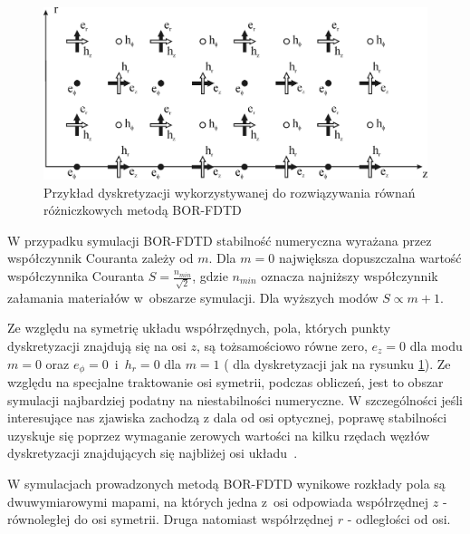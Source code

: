 \begin{figure}
	\includegraphics[width=\textwidth]{subart/fdtd/R5_TFSF.png}
	\caption{Przykład dyskretyzacji wykorzystywanej do rozwiązywania równań różniczkowych metodą BOR-FDTD \cite{antosiewicz2009wplyw}}
	\label{fig:bor-dysk}
\end{figure}
W przypadku symulacji BOR-FDTD stabilność numeryczna wyrażana przez współczynnik Couranta zależy od $m$. Dla $m=0$ największa dopuszczalna wartość współczynnika Couranta $S=\frac{n_{min}}{\sqrt{2}}$, gdzie $n_{min}$ oznacza najniższy współczynnik załamania materiałów w~obszarze symulacji. Dla wyższych modów $S \propto m+1$. 

Ze względu na symetrię układu współrzędnych, pola, których punkty dyskretyzacji znajdują się na osi $z$, są tożsamościowo równe zero, $e_z=0$ dla modu $m=0$ oraz $e_{\phi}=0$~i~$h_r=0$ dla $m=1$ ( dla dyskretyzacji jak na rysunku \ref{fig:bor-dysk}). Ze względu na specjalne traktowanie osi symetrii, podczas obliczeń, jest to obszar symulacji najbardziej podatny na niestabilności numeryczne. W szczególności jeśli interesujące nas zjawiska zachodzą z dala od osi optycznej, poprawę stabilności uzyskuje się poprzez wymaganie zerowych wartości na kilku rzędach węzłów dyskretyzacji znajdujących się najbliżej osi układu~\cite{OskooiRo10}.

W symulacjach prowadzonych metodą BOR-FDTD wynikowe rozkłady pola są dwuwymiarowymi mapami, na których jedna z~osi odpowiada współrzędnej $z$ - równoległej do osi symetrii. Druga natomiast współrzędnej $r$ - odległości od osi. 
